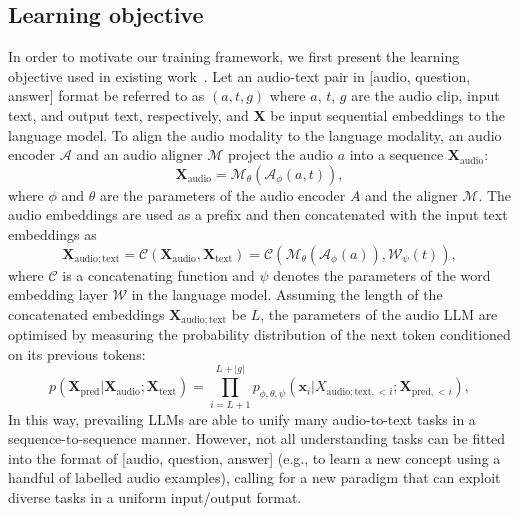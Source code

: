 \documentclass{article} %
\begin{document}
\subsection{Learning objective}  \label{subsec:learning_objective}
In order to motivate our training framework, we first present the learning objective used in existing work~\citep{deshmukh_pengi_2023}. Let an audio-text pair in [audio, question, answer] format be referred to as $(a, t, g)$ where $a$, $t$, $g$ are the audio clip, input text, and output text, respectively, and $\mathbf{X}$ be input sequential embeddings to the language model. To align the audio modality to the language modality, an audio encoder $\mathcal{A}$ and an audio aligner $\mathcal{M}$ project the audio $a$ into a sequence $\mathbf{X}_{\mathrm{audio}}$:
\begin{equation} \label{eqn.:extract_audio}
    \mathbf{X}_{\mathrm{audio}} = \mathcal{M}_{\theta}(\mathcal{A}_{\phi}(a, t)),
\end{equation}
where $\phi$ and $\theta$ are the parameters of the audio encoder $A$ and the aligner $\mathcal{M}$. The audio embeddings are used as a prefix and then concatenated with the input text embeddings as
\begin{equation} \label{eqn.:concat}
    \mathbf{X}_{\mathrm{audio;text}} =  \mathcal{C}(\mathbf{X}_{\mathrm{audio}}, \mathbf{X}_{\mathrm{text}}) = \mathcal{C}(\mathcal{M}_{\mathcal{\theta}}(\mathcal{A}_{\phi}(a)), \mathcal{W}_{\psi}(t)),
\end{equation}
where $\mathcal{C}$ is a concatenating function and $\psi$ denotes the parameters of the word embedding layer $\mathcal{W}$ in the language model. Assuming the length of the concatenated embeddings $\mathbf{X}_{\mathrm{audio;text}}$ be $L$, the parameters of the audio LLM are optimised by measuring the probability distribution of the next token conditioned on its previous tokens:
\begin{equation} \label{eqn.:next_token_pred}
    p(\mathbf{X}_{\mathrm{pred}}|\mathbf{X}_{\mathrm{audio}}; \mathbf{X}_{\mathrm{text}}) = \prod_{i=L+1}^{L+|g|}p_{\phi,\theta,\psi}(\mathbf{x}_i|X_{\mathrm{audio;text},<i}; \mathbf{X}_{\mathrm{pred},<i}),
\end{equation}
In this way, prevailing LLMs are able to unify many audio-to-text tasks in a sequence-to-sequence manner. However, not all understanding tasks can be fitted into the format of [audio, question, answer] (e.g., to learn a new concept using a handful of labelled audio examples), calling for a new paradigm that can exploit diverse tasks in a uniform input/output format.
\end{document}
